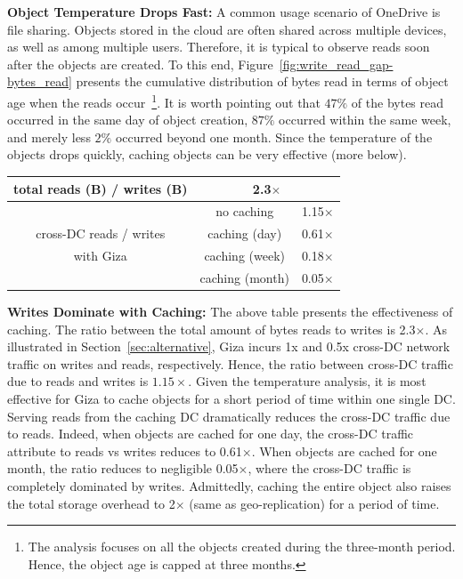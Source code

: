 {\bf Object Temperature Drops Fast:} A common usage scenario of OneDrive is file sharing. Objects stored in the cloud are often shared across multiple devices, as well as among multiple users. Therefore, it is typical to observe reads soon after the objects are created. To this end, Figure~\ref{fig:write_read_gap-bytes_read} presents the cumulative distribution of bytes read in terms of object age when the reads occur~\footnote{The analysis focuses on all the objects created during the three-month period. Hence, the object age is capped at three months.}. It is worth pointing out that $47\%$ of the bytes read occurred in the same day of object creation, $87\%$ occurred within the same week, and merely less $2\%$ occurred beyond one month. Since the temperature of the objects drops quickly, caching objects can be very effective (more below). 

\begin{table}[h]
\footnotesize
\centering
\begin{tabular}{|c||c|c|}
\hline \hline
total reads (B) / writes (B) 	& \multicolumn{2}{c|}{2.3$\times$}
\\ \hline \hline
	& no caching		& 1.15$\times$
\\ \cline{2-3}
cross-DC reads / writes
	& caching (day)		& 0.61$\times$ 
\\ \cline{2-3}
with Giza
	& caching (week)	& 0.18$\times$ 
\\ \cline{2-3}
	& caching (month)	& 0.05$\times$ 
\\ \hline \hline
\end{tabular}
\label{tab:caching}
\end{table}
{\bf Writes Dominate with Caching:} The above table presents the effectiveness of caching. The ratio between the total amount of bytes reads to writes is 2.3$\times$. 
As illustrated in Section~\ref{sec:alternative}, Giza incurs 1x and 0.5x
cross-DC network traffic on writes and reads, respectively. Hence, the ratio
between cross-DC traffic due to reads and writes is $1.15\times$. Given the
temperature analysis, it is most effective for Giza to cache objects for a short
period of time within one single DC. Serving reads from the caching DC
dramatically reduces the cross-DC traffic due to reads. Indeed, when objects are
cached for one day, the cross-DC traffic attribute to reads vs writes reduces to
0.61$\times$. When objects are cached for one month, the ratio reduces to
negligible 0.05$\times$, where the cross-DC traffic is completely dominated by
writes. Admittedly, caching the entire object also raises the total storage
overhead to 2$\times$ (same as geo-replication) for a period of time.

